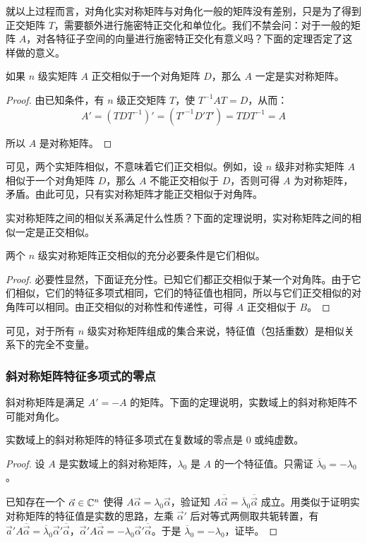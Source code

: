 就以上过程而言，对角化实对称矩阵与对角化一般的矩阵没有差别，只是为了得到正交矩阵 $T$，需要额外进行施密特正交化和单位化。我们不禁会问：对于一般的矩阵 $A$，对各特征子空间的向量进行施密特正交化有意义吗？下面的定理否定了这样做的意义。

\begin{theorem}
	如果 $n$ 级实矩阵 $A$ 正交相似于一个对角矩阵 $D$，那么 $A$ 一定是实对称矩阵。
\end{theorem}

\begin{proof}
	由已知条件，有 $n$ 级正交矩阵 $T$，使 $T^{-1} AT = D$，从而：
	$$
	A' = (TDT^{-1})' = ({T'}^{-1} D' T') = TDT^{-1} = A
	$$

	所以 $A$ 是对称矩阵。
\end{proof}

可见，两个实矩阵相似，不意味着它们正交相似。例如，设 $n$ 级非对称实矩阵 $A$ 相似于一个对角矩阵 $D$，那么 $A$ 不能正交相似于 $D$，否则可得 $A$ 为对称矩阵，矛盾。由此可见，只有实对称矩阵才能正交相似于对角阵。

实对称矩阵之间的相似关系满足什么性质？下面的定理说明，实对称矩阵之间的相似一定是正交相似。

\begin{theorem}
	两个 $n$ 级实对称矩阵正交相似的充分必要条件是它们相似。
\end{theorem}

\begin{proof}
	必要性显然，下面证充分性。已知它们都正交相似于某一个对角阵。由于它们相似，它们的特征多项式相同，它们的特征值也相同，所以与它们正交相似的对角阵可以相同。由正交相似的对称性和传递性，可得 $A$ 正交相似于 $B$。
\end{proof}

可见，对于所有 $n$ 级实对称矩阵组成的集合来说，特征值（包括重数）是相似关系下的完全不变量。

\subsubsection{斜对称矩阵特征多项式的零点}

斜对称矩阵是满足 $A' = -A$ 的矩阵。下面的定理说明，实数域上的斜对称矩阵不可能对角化。

\begin{theorem}
	实数域上的斜对称矩阵的特征多项式在复数域的零点是 $0$ 或纯虚数。
\end{theorem}

\begin{proof}
	设 $A$ 是实数域上的斜对称矩阵，$\lambda_0$ 是 $A$ 的一个特征值。只需证 $\overline \lambda_0 = - \lambda_0$。

	已知存在一个 $\vec \alpha \in \mathbb C^n$ 使得 $A \vec \alpha = \lambda_0 \vec \alpha$，验证知 $A \overline{\vec \alpha} = \overline \lambda_0 \overline{\vec \alpha}$ 成立。用类似于证明实对称矩阵的特征值是实数的思路，左乘 $\vec \alpha'$ 后对等式两侧取共轭转置，有 $\vec a' A \overline{\vec \alpha} = \overline \lambda_0 \vec \alpha' \overline{\vec \alpha}$，$\vec \alpha' A \overline{\vec \alpha} = - \lambda_0 \vec \alpha' \overline{\vec \alpha}$。于是 $\overline \lambda_0 = - \lambda_0$，证毕。
\end{proof}

